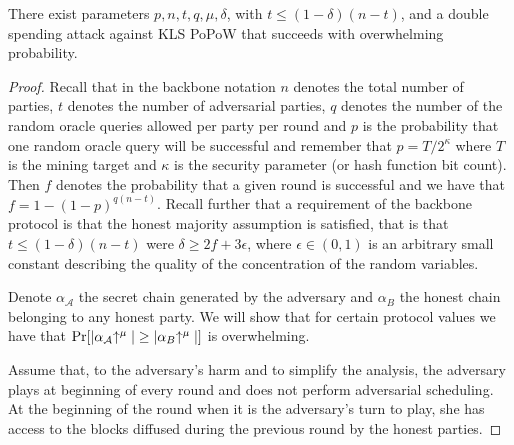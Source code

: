 \begin{theorem}
There exist parameters $p, n, t, q,  \mu, \delta$, with $t\leq (1-\delta)(n-t)$,
and a double spending attack against KLS PoPoW that succeeds with overwhelming
probability.
\end{theorem}
\begin{proof}
Recall that in the backbone notation $n$ denotes the total number of parties,
$t$ denotes the number of adversarial parties, $q$ denotes the number of the
random oracle queries allowed per party per round and $p$ is the probability that
one random oracle query will be successful and remember that $p = T / 2^\kappa$
where $T$ is the mining target and $\kappa$ is the security parameter (or hash
function bit count). Then $f$ denotes the probability that a given round is
successful and we have that $f = 1 - (1 - p)^{q(n-t)}$. Recall further that a
requirement of the backbone protocol is that the honest majority assumption is
satisfied, that is that $t \leq (1 - \delta)(n - t)$ were $\delta \geq 2f +
3\epsilon$, where $\epsilon \in (0, 1)$ is an arbitrary small constant describing
the quality of the concentration of the random variables.

Denote $\alpha_\mathcal{A}$ the secret chain generated by the adversary and
$\alpha_B$ the honest chain belonging to any honest party. We will show that
for certain protocol values we have that
$\Pr[|\alpha_\mathcal{A}\negthickspace\uparrow^\mu| \geq |\alpha_B\negthickspace\uparrow^\mu|]$ is
overwhelming.

Assume that, to the adversary's harm and to simplify the analysis, the adversary
plays at beginning of every round and does not perform adversarial scheduling.
At the beginning of the round when it is the adversary's turn to play, she has
access to the blocks diffused during the previous round by the honest parties.


\end{proof}
